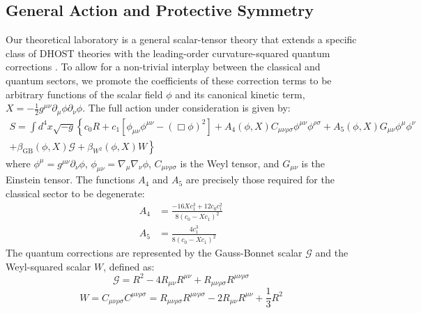 \documentclass[twocolumn]{aastex631}
\begin{document}
\subsection{General Action and Protective Symmetry}
Our theoretical laboratory is a general scalar-tensor theory that extends a specific class of DHOST theories \citep{yousaf2024orthogonalsplittingdegeneratehigherorder} with the leading-order curvature-squared quantum corrections \citep{villegas2024quantumhighercurvaturecorrections}. To allow for a non-trivial interplay between the classical and quantum sectors, we promote the coefficients of these correction terms to be arbitrary functions of the scalar field $\phi$ and its canonical kinetic term, $X = -\frac{1}{2} g^{\mu\nu}\partial_\mu\phi\partial_\nu\phi$. The full action under consideration is given by:
\begin{multline}S = \int d^4x \sqrt{-g} \left\{ c_0 R + c_1 \left[\phi_{\mu\nu}\phi^{\mu\nu} - (\Box\phi)^2\right] + A_4(\phi, X) C_{\mu\nu\rho\sigma} \phi^{\mu\nu}\phi^{\rho\sigma} + A_5(\phi, X) G_{\mu\nu}\phi^\mu\phi^\nu \right. \\\left. + \beta_{\text{GB}}(\phi, X) \mathcal{G} + \beta_{W^2}(\phi, X) W \right\}\end{multline}
where $\phi^\mu = g^{\mu\nu}\partial_\nu\phi$, $\phi_{\mu\nu} = \nabla_\mu\nabla_\nu\phi$, $C_{\mu\nu\rho\sigma}$ is the Weyl tensor, and $G_{\mu\nu}$ is the Einstein tensor. The functions $A_4$ and $A_5$ are precisely those required for the classical sector to be degenerate:
\begin{align}
A_4 &= \frac{-16Xc_1^3 + 12c_0c_1^2}{8(c_0 - Xc_1)^2} \\
A_5 &= \frac{4c_1^3}{8(c_0 - Xc_1)^2}
\end{align}
The quantum corrections are represented by the Gauss-Bonnet scalar $\mathcal{G}$ and the Weyl-squared scalar $W$, defined as: \citep{baykal2010unifiedapproachvariationalderivatives,rachwał2022understandstructurebetafunctions}
\begin{equation}
\mathcal{G} = R^2 - 4R_{\mu\nu}R^{\mu\nu} + R_{\mu\nu\rho\sigma}R^{\mu\nu\rho\sigma}
\end{equation}
\begin{equation}
W = C_{\mu\nu\rho\sigma}C^{\mu\nu\rho\sigma} = R_{\mu\nu\rho\sigma}R^{\mu\nu\rho\sigma} - 2R_{\mu\nu}R^{\mu\nu} + \frac{1}{3}R^2
\end{equation}
\citep{pommaret2016bianchiidentitiesriemannweyl}
\end{document}
